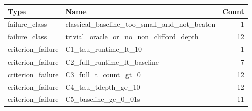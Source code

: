 \begin{tabular}{llr}
\toprule
Type & Name & Count \\
\midrule
failure\_class & classical\_baseline\_too\_small\_and\_not\_beaten & 1 \\
failure\_class & trivial\_oracle\_or\_no\_non\_clifford\_depth & 12 \\
criterion\_failure & C1\_tau\_runtime\_lt\_10 & 1 \\
criterion\_failure & C2\_full\_runtime\_lt\_baseline & 7 \\
criterion\_failure & C3\_full\_t\_count\_gt\_0 & 12 \\
criterion\_failure & C4\_tau\_tdepth\_ge\_10 & 12 \\
criterion\_failure & C5\_baseline\_ge\_0\_01s & 11 \\
\bottomrule
\end{tabular}
